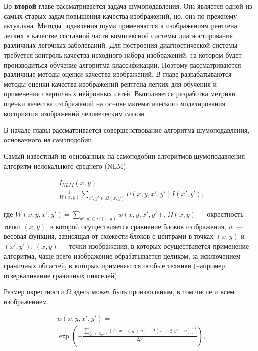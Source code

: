 Во {\textbf{второй}} главе рассматривается задача шумоподавления. Она является одной из самых старых задач повышения качества изображений, но, она по-прежнему актуальна. Методы подавления шума применяются к изображениям рентгена легких в качестве составной части комплексной системы диагностирования различных легочных заболеваний. Для построения диагностической системы требуется контроль качества исходного набора изображений, на котором будет производиться обучение алгоритма классификации. Поэтому рассматриваются различные методы оценки качества изображений. В главе разрабатываются методы оценки качества изображений рентгена легких для обучения и применения сверточных нейронных сетей. Выполняется разработка метрики оценки качества изображений на основе математического моделирования восприятия изображений человеческим глазом.

В начале главы рассматривается совершенствование алгоритма шумоподавления, основанного на самоподобии.

Самый известный из основанных на самоподобии алгоритмов шумоподавления --- алгоритм нелокального среднего (NLM).

\begin{equation}
\begin{split}
	&I_{NLM}(x,y) = \\
	&\frac{1}{W(x,y)}\sum_{x',y'\in\Omega(x,y)} w(x,y,x',y')I(x',y'),
\end{split}
\end{equation}

 \noindent где $W(x,y,x',y') = \sum_{x',y'\in\Omega(x,y)} w(x,y,x',y')$, $\Omega(x,y)$ --- окрестность точки $(x,y)$, в которой осуществляется сравнение блоков изображения, $w$ --- весовая функция, зависящая от схожести блоков с центрами в точках $(x,y)$ и $(x',y')$, $(x,y)$ --- точки изображения, в которых осуществляется применение алгоритма, чаще всего изображение обрабатывается целиком, за исключением граничных областей, в которых применяются особые техники (например, отзеркаливание граничных пикселей).

Размер окрестности $\Omega$ здесь может быть произвольным, в том числе и всем изображением.

\begin{equation}
\begin{split}
	&w(x,y,x',y') = \\
	&\exp(-\frac{\sum_{\xi,\eta\in\Omega_{patch}} (I(x+\xi,y+\eta) - I(x'+\xi,y'+\eta))^2}{2\rho^2}),
\end{split}
\end{equation} 
 
